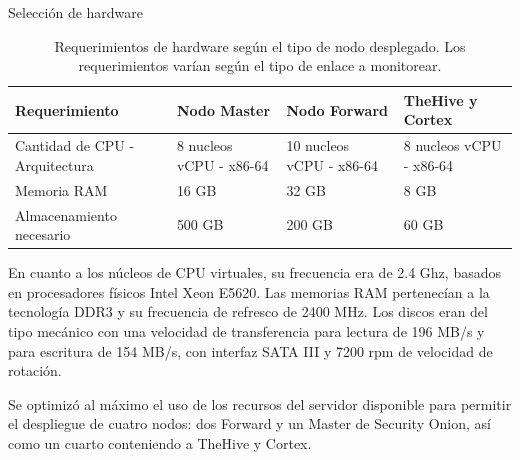 \begin{section}{Selección de hardware}
\begin{table}[H]
\begin{tabular}{|m{9em}|m{9em}|m{9em}|m{9em}|}
            \hline 
                Requerimiento  & Nodo Master &  Nodo Forward & TheHive y Cortex \\ 
            \hline
                Cantidad de CPU - Arquitectura & 8 nucleos vCPU - x86-64 & 10 nucleos vCPU - x86-64 & 8 nucleos vCPU - x86-64 \\ 
            \hline
                Memoria RAM  & 16 GB & 32 GB & 8 GB \\ 
            \hline
                Almacenamiento necesario & 500 GB  & 200 GB & 60 GB \\
            \hline %
        \end{tabular}
        \caption{Requerimientos de hardware según el tipo de nodo desplegado. Los requerimientos varían según el tipo de enlace a monitorear.}
        \label{table:12}
        \end{table}
        \FloatBarrier
        En cuanto a los núcleos de CPU virtuales, su frecuencia era de 2.4 Ghz, basados en procesadores físicos Intel Xeon E5620. Las memorias RAM pertenecían a la tecnología DDR3 y su frecuencia de refresco de 2400 MHz.
        Los discos eran del tipo mecánico con una velocidad de transferencia para lectura de 196 MB/s y para escritura de 154 MB/s, con interfaz SATA III y 7200 rpm de velocidad de rotación. \par
    	Se optimizó al máximo el uso de los recursos del servidor disponible para permitir el despliegue de cuatro nodos: dos Forward y un Master de Security Onion, así como un cuarto conteniendo a TheHive y Cortex. \par


\end{section}
